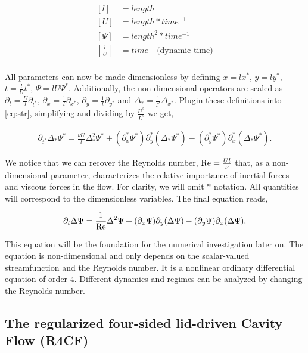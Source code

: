 \begin{equation}
\begin{split}
\left[ l \right] &= length  \\
\left[ U \right] &= length*time^{-1} \\
\left[ \Psi \right] &= length^2*time^{-1} \\
\left[ \frac{l}{U} \right] &= time \quad \text{(dynamic time)} \\
\end{split}
\label{eq:scl}
\end{equation}

All parameters can now be made dimensionless by defining $x = l x^*$, $y = l
y^*$, $t = \frac{l}{U} t^*$, $\Psi = lU \Psi^*$. Additionally, the
non-dimensional operators are scaled as $\partial_t = \frac{U}{l}
\partial_{t^*}$, $\partial_x = \frac{1}{l} \partial_{x^*}$, $\partial_y =
\frac{1}{l} \partial_{y^*}$ and $\Delta_* = \frac{1}{l^2} \Delta_{x^*}$. Plugin
these definitions into \eqref{eq:str}, simplifying and dividing by
$\frac{U^2}{L^2}$ we get,

\begin{align}
\partial_{t^*} \Delta_* \Psi^* = \frac{\nu U}{l} \Delta^2_* \Psi^*
  + (\partial_x^* \Psi^*) \partial_y^*(\Delta_* \Psi^*)
  - (\partial_y^* \Psi^*) \partial_x^*(\Delta_* \Psi^*). 
\end{align}

We notice that we can recover the Reynolds number, $\mathrm{Re} = \frac{Ul}{\nu}$ that,
as a non-dimensional parameter, characterizes the relative importance of
inertial forces and viscous forces in the flow. For clarity, we will omit $*$
notation. All quantities will correspond to the dimensionless variables. The
final equation reads,

\begin{align}
\partial_t \Delta \Psi = \frac{1}{\mathrm{Re}} \Delta^2 \Psi
  + (\partial_x \Psi) \partial_y(\Delta \Psi)
  - (\partial_y \Psi) \partial_x(\Delta \Psi). \label{eq:str}
\end{align}

This equation will be the foundation for the numerical investigation later on.
The equation is non-dimensional and only depends on the scalar-valued
streamfunction and the Reynolds number. It is a nonlinear ordinary differential
equation of order 4. Different dynamics and regimes can be analyzed by changing
the Reynolds number.

\subsection{The regularized four-sided lid-driven Cavity Flow (R4CF)} \label{sec:r4sc}

